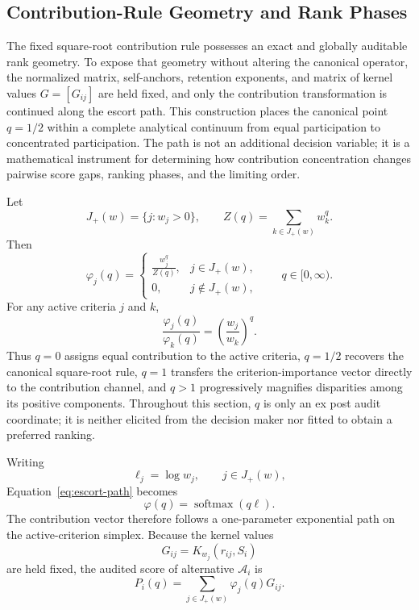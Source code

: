 \documentclass[reqno,11pt]{amsart}
\theoremstyle{definition}
\theoremstyle{plain}
\theoremstyle{remark}
\begin{document}
\subsection{Contribution-Rule Geometry and Rank Phases}
\label{subsec:escort-geometry}
The fixed square-root contribution rule possesses an exact and globally
auditable rank geometry. To expose that geometry without altering the
canonical operator, the normalized matrix, self-anchors, retention
exponents, and matrix of kernel values \(G=[G_{ij}]\) are held fixed, and only the
contribution transformation is continued along the escort path. This
construction places the canonical point \(q=1/2\) within a complete
analytical continuum from equal participation to concentrated
participation. The path is not an additional decision variable; it is a
mathematical instrument for determining how contribution concentration
changes pairwise score gaps, ranking phases, and the limiting order.


Let
\[
J_{+}(w)=\{j:w_j>0\},
\qquad
Z(q)=\sum_{k\in J_{+}(w)}w_k^q.
\]
Then
\begin{equation}
\varphi_j(q)
=
\begin{cases}
\displaystyle
\frac{w_j^q}{Z(q)}, & j\in J_{+}(w),\\[3mm]
0, & j\notin J_{+}(w),
\end{cases}
\qquad
q\in[0,\infty).
\label{eq:escort-path}
\end{equation}
For any active criteria \(j\) and \(k\),
\begin{equation*}
\frac{\varphi_j(q)}{\varphi_k(q)}
=
\left(\frac{w_j}{w_k}\right)^q.
\end{equation*}
Thus \(q=0\) assigns equal contribution to the active criteria,
\(q=1/2\) recovers the canonical square-root rule, \(q=1\) transfers the
criterion-importance vector directly to the contribution channel, and
\(q>1\) progressively magnifies disparities among its positive components.
Throughout this section, \(q\) is only an ex post audit coordinate; it is
neither elicited from the decision maker nor fitted to obtain a preferred
ranking.

Writing
\[
\ell_j=\log w_j,
\qquad j\in J_{+}(w),
\]
Equation~\eqref{eq:escort-path} becomes
\begin{equation*}
\varphi(q)
=
\operatorname{softmax}(q\ell).
\end{equation*}
The contribution vector therefore follows a one-parameter exponential
path on the active-criterion simplex. Because the kernel values
\[
G_{ij}=K_{w_j}(r_{ij},S_i)
\]
are held fixed, the audited score of alternative \(\mathcal A_i\) is
\begin{equation}
P_i(q)
=
\sum_{j\in J_{+}(w)}\varphi_j(q)G_{ij}.
\label{eq:escort-score}
\end{equation}
\end{document}
